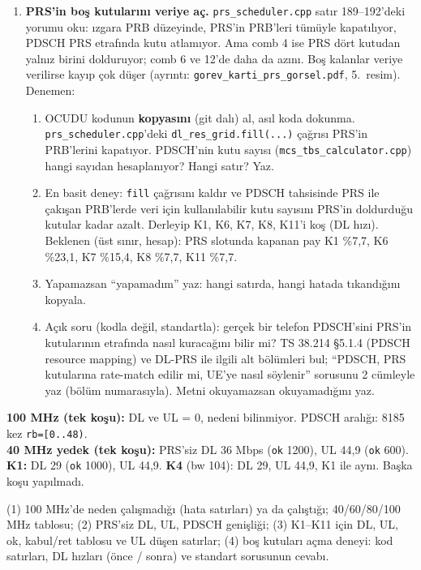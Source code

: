 \documentclass[11pt,a4paper]{article}
\begin{document}
\begin{enumerate}[leftmargin=1.6em]
\item \textbf{PRS'in boş kutularını veriye aç.} \texttt{prs\_scheduler.cpp} satır 189--192'deki yorumu oku: ızgara PRB düzeyinde, PRS'in PRB'leri tümüyle kapatılıyor, PDSCH PRS etrafında kutu atlamıyor. Ama comb 4 ise PRS dört kutudan yalnız birini dolduruyor; comb 6 ve 12'de daha da azını. Boş kalanlar veriye verilirse kayıp çok düşer (ayrıntı: \texttt{gorev\_karti\_prs\_gorsel.pdf}, 5.\ resim). Denemen:
\begin{enumerate}[label=(\alph*),leftmargin=1.6em]
\item OCUDU kodunun \textbf{kopyasını} (git dalı) al, asıl koda dokunma. \texttt{prs\_scheduler.cpp}'deki \texttt{dl\_res\_grid.fill(...)} çağrısı PRS'in PRB'lerini kapatıyor. PDSCH'nin kutu sayısı (\texttt{mcs\_tbs\_calculator.cpp}) hangi sayıdan hesaplanıyor? Hangi satır? Yaz.
\item En basit deney: \texttt{fill} çağrısını kaldır ve PDSCH tahsisinde PRS ile çakışan PRB'lerde veri için kullanılabilir kutu sayısını PRS'in doldurduğu kutular kadar azalt. Derleyip K1, K6, K7, K8, K11'i koş (DL hızı). Beklenen (üst sınır, hesap): PRS slotunda kapanan pay K1 \%7,7, K6 \%23,1, K7 \%15,4, K8 \%7,7, K11 \%7,7.
\item Yapamazsan ``yapamadım'' yaz: hangi satırda, hangi hatada tıkandığını kopyala.
\item Açık soru (kodla değil, standartla): gerçek bir telefon PDSCH'sini PRS'in kutularının etrafında nasıl kuracağını bilir mi? TS 38.214 §5.1.4 (PDSCH resource mapping) ve DL-PRS ile ilgili alt bölümleri bul; ``PDSCH, PRS kutularına rate-match edilir mi, UE'ye nasıl söylenir'' sorusunu 2 cümleyle yaz (bölüm numarasıyla). Metni okuyamazsan okuyamadığını yaz.
\end{enumerate}
\end{enumerate}

\begin{kontrol}
\textbf{100 MHz (tek koşu):} DL ve UL = 0, nedeni bilinmiyor. PDSCH aralığı: 8185 kez \texttt{rb=[0..48)}.\\
\textbf{40 MHz yedek (tek koşu):} PRS'siz DL 36 Mbps (\texttt{ok} 1200), UL 44,9 (\texttt{ok} 600). \textbf{K1:} DL 29 (\texttt{ok} 1000), UL 44,9. \textbf{K4} (bw 104): DL 29, UL 44,9, K1 ile aynı. Başka koşu yapılmadı.
\end{kontrol}

\begin{teslim}
(1) 100 MHz'de neden çalışmadığı (hata satırları) ya da çalıştığı; 40/60/80/100 MHz tablosu; (2) PRS'siz DL, UL, PDSCH genişliği; (3) K1--K11 için DL, UL, ok, kabul/ret tablosu ve UL düşen satırlar; (4) boş kutuları açma deneyi: kod satırları, DL hızları (önce / sonra) ve standart sorusunun cevabı.
\end{teslim}
\end{document}

